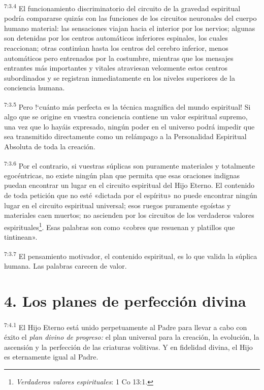 \par
\textsuperscript{7:3.4} El funcionamiento discriminatorio del circuito de la gravedad espiritual podría compararse quizás con las funciones de los circuitos neuronales del cuerpo humano material: las sensaciones viajan hacia el interior por los nervios; algunas son detenidas por los centros automáticos inferiores espinales, los cuales reaccionan; otras continúan hasta los centros del cerebro inferior, menos automáticos pero entrenados por la costumbre, mientras que los mensajes entrantes más importantes y vitales atraviesan velozmente estos centros subordinados y se registran inmediatamente en los niveles superiores de la conciencia humana.

\par
\textsuperscript{7:3.5} Pero !`cuánto más perfecta es la técnica magnífica del mundo espiritual! Si algo que se origine en vuestra conciencia contiene un valor espiritual supremo, una vez que lo hayáis expresado, ningún poder en el universo podrá impedir que sea transmitido directamente como un relámpago a la Personalidad Espiritual Absoluta de toda la creación.

\par
\textsuperscript{7:3.6} Por el contrario, si vuestras súplicas son puramente materiales y totalmente egocéntricas, no existe ningún plan que permita que esas oraciones indignas puedan encontrar un lugar en el circuito espiritual del Hijo Eterno. El contenido de toda petición que no esté «dictada por el espíritu» no puede encontrar ningún lugar en el circuito espiritual universal; esos ruegos puramente egoístas y materiales caen muertos; no ascienden por los circuitos de los verdaderos valores espirituales\footnote{\textit{Verdaderos valores espirituales}: 1 Co 13:1.}. Esas palabras son como «cobres que resuenan y platillos que tintinean».

\par
\textsuperscript{7:3.7} El pensamiento motivador, el contenido espiritual, es lo que valida la súplica humana. Las palabras carecen de valor.

\section*{4. Los planes de perfección divina}
\par
\textsuperscript{7:4.1} El Hijo Eterno está unido perpetuamente al Padre para llevar a cabo con éxito el \textit{plan divino de progreso:} el plan universal para la creación, la evolución, la ascensión y la perfección de las criaturas volitivas. Y en fidelidad divina, el Hijo es eternamente igual al Padre.

